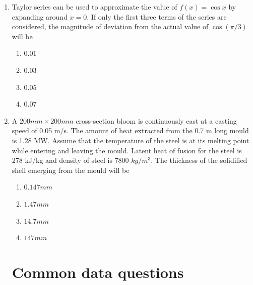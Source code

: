 \documentclass[journal]{IEEEtran}
\theoremstyle{remark}
\begin{document}
\begin{enumerate}
\begin {multicols}{4}
\begin{enumerate}
\item$138 kg$
\item $238 kg$
\item  $338 kg$ 
\item  $438 kg$
\end{enumerate}
\end{multicols}

\item   Taylor series can be used to approximate the value of $f(x) = \cos{x}$ by expanding around $x = 0$. If only the first three terms of the series are considered, the magnitude of deviation from the actual value of $\cos({\pi/3})$ will be
\hfill{}
\begin{multicols}{4}
\begin{enumerate}
\item  $0.01$
\item $0.03$
\item $0.05$
\item $0.07$
\end{enumerate}
\end{multicols}

\item  A $200 mm \times 200 mm$ cross-section bloom is continuously cast at a casting speed of 0.05 m/s. The amount of heat extracted from the 0.7 m long mould is 1.28 MW. Assume that the temperature of the steel is at its melting point while entering and leaving the mould. Latent heat of fusion for the steel is 278 kJ/kg and density of steel is 7800 $kg/m^3$. The thickness of the solidified shell emerging from the
mould will be \hfill{}
\begin{multicols}{4}
\begin{enumerate}
\item $0.147 mm$
\item $1.47 mm$
\item  $14.7 mm$
\item  $147 mm$
\end{enumerate}
\end{multicols}
\section*{Common data questions}

\end{enumerate}
\end{document}
